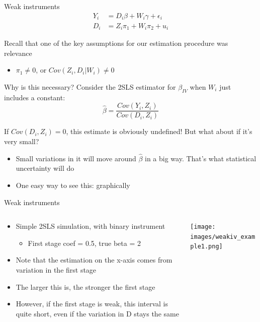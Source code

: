 \documentclass[notes,11pt, aspectratio=169]{beamer}
\newenvironment{wideitemize}{\itemize\addtolength{\itemsep}{10pt}}{\enditemize}
\begin{document}
\begin{frame}{Weak instruments}
  \begin{align*}
    Y_{i} &= D_{i}\beta + W_{i}\gamma + \epsilon_{i}\\
    D_{i} &= Z_{i}\pi_{1} + W_{i}\pi_{2} + u_{i}
  \end{align*}
  \begin{wideitemize}
  \item Recall that one of the key assumptions for our estimation
    procedure was relevance
    \begin{itemize}
    \item $\pi_{1} \not= 0$, or $Cov(Z_{i}, D_{i} | W_{i}) \not= 0$
    \end{itemize}
  \item Why is this necessary? Consider the 2SLS estimator for
    $\beta_{IV}$ when $W_{i}$ just includes a constant:
    $$\hat{\beta} = \frac{Cov(Y_{i}, Z_{i})}{Cov(D_{i}, Z_{i})}$$
  \item If $Cov(D_{i}, Z_{i}) = 0$, this estimate is obviously undefined! But what about if it's very small?
    \begin{itemize}
    \item Small variations in it will move around $\hat{\beta}$ in a
      big way. That's what statistical uncertainty will do
    \item One easy way to see this: graphically
    \end{itemize}
  \end{wideitemize}
\end{frame}

\begin{frame}{Weak instruments}
  \begin{columns}[T] %
    \begin{column}{0.5\textwidth}
  \begin{itemize}
  \item Simple 2SLS simulation, with binary instrument
    \begin{itemize}
    \item First stage coef = 0.5, true beta = 2
    \end{itemize}
  \item Note that the estimation on the x-axis comes from variation in the first stage
  \item The larger this is, the stronger the first stage
  \item However, if the first stage is weak, this interval is quite short, even if the variation in D stays the same
  \end{itemize}
\end{column}
\begin{column}{0.5\textwidth}
  \texttt{[image: images/weakiv\_example1.png]}
\end{column}
\end{columns}
\end{frame}
\end{document}
